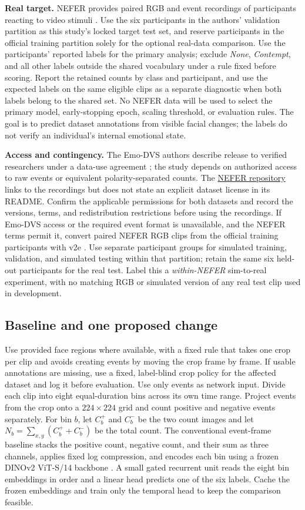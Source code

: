 \textbf{Real target.} NEFER provides paired RGB and event recordings of participants reacting to video stimuli \cite{berlincioni2023}. Use the six participants in the authors' validation partition as this study's locked target test set, and reserve participants in the official training partition solely for the optional real-data comparison. Use the participants' reported labels for the primary analysis; exclude \emph{None}, \emph{Contempt}, and all other labels outside the shared vocabulary under a rule fixed before scoring. Report the retained counts by class and participant, and use the expected labels on the same eligible clips as a separate diagnostic when both labels belong to the shared set. No NEFER data will be used to select the primary model, early-stopping epoch, scaling threshold, or evaluation rules. The goal is to predict dataset annotations from visible facial changes; the labels do not verify an individual's internal emotional state.

\textbf{Access and contingency.} The Emo-DVS authors describe release to verified researchers under a data-use agreement \cite{chen2026}; the study depends on authorized access to raw events or equivalent polarity-separated counts. The \href{https://github.com/miccunifi/NEFER}{NEFER repository} links to the recordings but does not state an explicit dataset license in its README. Confirm the applicable permissions for both datasets and record the versions, terms, and redistribution restrictions before using the recordings. If Emo-DVS access or the required event format is unavailable, and the NEFER terms permit it, convert paired NEFER RGB clips from the official training participants with v2e \cite{hu2021}. Use separate participant groups for simulated training, validation, and simulated testing within that partition; retain the same six held-out participants for the real test. Label this a \emph{within-NEFER} sim-to-real experiment, with no matching RGB or simulated version of any real test clip used in development.

\subsection{Baseline and one proposed change}
Use provided face regions where available, with a fixed rule that takes one crop per clip and avoids creating events by moving the crop frame by frame. If usable annotations are missing, use a fixed, label-blind crop policy for the affected dataset and log it before evaluation. Use only events as network input. Divide each clip into eight equal-duration bins across its own time range. Project events from the crop onto a $224\times224$ grid and count positive and negative events separately. For bin $b$, let $C_b^+$ and $C_b^-$ be the two count images and let $N_b=\sum_{x,y}(C_b^++C_b^-)$ be the total count. The conventional event-frame baseline stacks the positive count, negative count, and their sum as three channels, applies fixed log compression, and encodes each bin using a frozen DINOv2 ViT-S/14 backbone \cite{oquab2024}. A small gated recurrent unit reads the eight bin embeddings in order and a linear head predicts one of the six labels. Cache the frozen embeddings and train only the temporal head to keep the comparison feasible.

